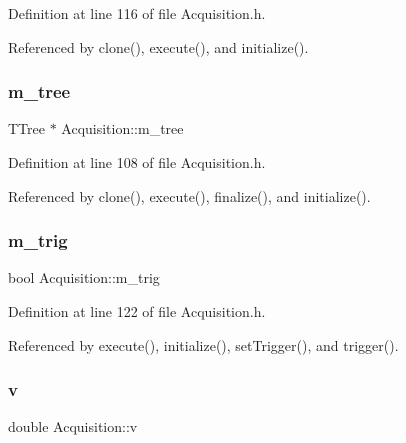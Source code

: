 Definition at line 116 of file Acquisition.\+h.



Referenced by clone(), execute(), and initialize().

\mbox{\label{classAcquisition_aa88a923232e8b7e08f5c1b5411497fc5}} 
\subsubsection{\texorpdfstring{m\+\_\+tree}{m\_tree}}
{\footnotesize\ttfamily T\+Tree $\ast$ Acquisition\+::m\+\_\+tree\hspace{0.3cm}{\ttfamily [private]}}



Definition at line 108 of file Acquisition.\+h.



Referenced by clone(), execute(), finalize(), and initialize().

\mbox{\label{classAcquisition_a953bdc1bf56206b6df33b648af32a24f}} 
\subsubsection{\texorpdfstring{m\+\_\+trig}{m\_trig}}
{\footnotesize\ttfamily bool Acquisition\+::m\+\_\+trig\hspace{0.3cm}{\ttfamily [private]}}



Definition at line 122 of file Acquisition.\+h.



Referenced by execute(), initialize(), set\+Trigger(), and trigger().

\mbox{\label{classAcquisition_ac855680c9bb5f8f14d505d5f41f1a076}} 
\subsubsection{\texorpdfstring{v}{v}}
{\footnotesize\ttfamily double Acquisition\+::v\hspace{0.3cm}{\ttfamily [private]}}



